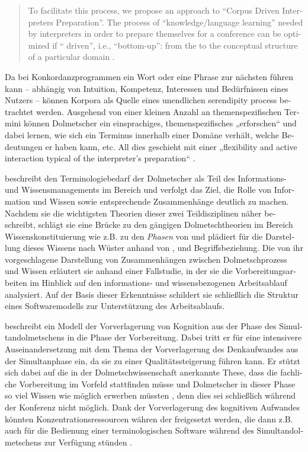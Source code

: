 \documentclass[output=paper]{LSP/langsci}
\begin{document}
\begin{otherlanguage}{ngerman}
\begin{quote}
To facilitate this process, we propose an approach to “Corpus Driven Interpreters Preparation”. The process of “knowledge/language learning” needed by interpreters in order to prepare themselves for a conference can be optimized if “ driven”, i.e., “bottom-up”: from the  to the conceptual structure of a particular domain \citep[174]{Fantinuoli2006}.
\end{quote}

Da bei Konkordanzprogrammen ein Wort oder eine Phrase zur nächsten führen kann -- abhängig von Intuition, Kompetenz, Interessen und Bedürfnissen eines Nutzers -- können Korpora als Quelle eines unendlichen serendipity process \citep{Johns1988} betrachtet werden. Ausgehend von einer kleinen Anzahl an themenspezifischen Termini können Dolmetscher ein einsprachiges, themenspezifisches  „erforschen“ und dabei lernen, wie sich ein Terminus innerhalb einer Domäne verhält, welche Bedeutungen er haben kann, etc. All dies geschieht mit einer „flexibility and active interaction typical of the interpreter's preparation“  \citep[174]{Fantinuoli2006}.

\citet{Rütten2007} beschreibt den Terminologiebedarf der Dolmetscher als Teil des Informations- und Wissensmanagements im Bereich  und verfolgt das Ziel, die Rolle von Information und Wissen sowie entsprechende Zusammenhänge deutlich zu machen. Nachdem sie die wichtigsten Theorien dieser zwei Teildisziplinen näher beschreibt, schlägt sie eine Brücke zu den gängigen Dolmetschtheorien im Bereich Wissenskonstituierung wie z.B. zu den \textit{Phasen} von \citet[778]{Kalina2005} und plädiert für die Darstellung dieses Wissens nach Wüster \citep[83]{Rütten2007} anhand von ,  und Begriffsbeziehung. Die von ihr vorgeschlagene Darstellung von Zusammenhängen zwischen Dolmetschprozess und Wissen erläutert sie anhand einer Fallstudie, in der sie die Vorbereitungsarbeiten im Hinblick auf den informations- und wissensbezogenen Arbeitsablauf analysiert. Auf der Basis dieser Erkenntnisse schildert sie schließlich die Struktur eines Softwaremodells zur Unterstützung des Arbeitsablaufs.

\citet{Stoll2009} beschreibt ein Modell der Vorverlagerung von Kognition aus der Phase des Simultandolmetschens in die Phase der Vorbereitung. Dabei tritt er für eine intensivere Auseinandersetzung mit dem Thema der Vorverlagerung des Denkaufwandes aus der Simultanphase ein, da sie zu einer Qualitätssteigerung führen kann. Er stützt sich dabei auf die in der Dolmetschwissenschaft anerkannte These, dass die fachliche Vorbereitung im Vorfeld stattfinden müsse und Dolmetscher in dieser Phase so viel Wissen wie möglich erwerben müssten \citep[147]{Gile1995}, denn dies sei schließlich während der Konferenz nicht möglich. Dank der Vorverlagerung des kognitiven Aufwandes könnten Konzentrationsressourcen währen der  freigesetzt werden, die dann z.B. auch für die Bedienung einer terminologischen Software während des Simultandolmetschens zur Verfügung stünden \citep[49]{Stoll2002}.


\end{otherlanguage}
\end{document}
